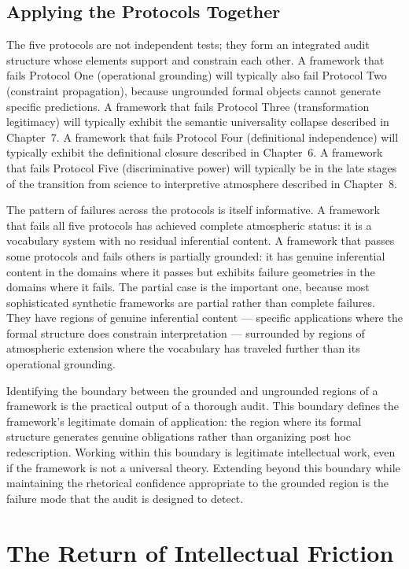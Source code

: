 \documentclass[12pt, openright, twoside]{book}
\begin{document}
\section{Applying the Protocols Together}

The five protocols are not independent tests; they form an integrated audit
structure whose elements support and constrain each other. A framework that
fails Protocol One (operational grounding) will typically also fail Protocol
Two (constraint propagation), because ungrounded formal objects cannot
generate specific predictions. A framework that fails Protocol Three
(transformation legitimacy) will typically exhibit the semantic universality
collapse described in Chapter~7. A framework that fails Protocol Four
(definitional independence) will typically exhibit the definitional closure
described in Chapter~6. A framework that fails Protocol Five (discriminative
power) will typically be in the late stages of the transition from science
to interpretive atmosphere described in Chapter~8.

The pattern of failures across the protocols is itself informative. A
framework that fails all five protocols has achieved complete atmospheric
status: it is a vocabulary system with no residual inferential content.
A framework that passes some protocols and fails others is partially grounded:
it has genuine inferential content in the domains where it passes but
exhibits failure geometries in the domains where it fails. The partial
case is the important one, because most sophisticated synthetic frameworks
are partial rather than complete failures. They have regions of genuine
inferential content --- specific applications where the formal structure
does constrain interpretation --- surrounded by regions of atmospheric
extension where the vocabulary has traveled further than its operational
grounding.

Identifying the boundary between the grounded and ungrounded regions of
a framework is the practical output of a thorough audit. This boundary
defines the framework's legitimate domain of application: the region where
its formal structure generates genuine obligations rather than organizing
post hoc redescription. Working within this boundary is legitimate
intellectual work, even if the framework is not a universal theory. Extending
beyond this boundary while maintaining the rhetorical confidence appropriate
to the grounded region is the failure mode that the audit is designed to detect.

\chapter{The Return of Intellectual Friction}
\end{document}
